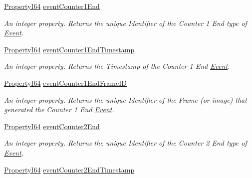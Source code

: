 \begin{DoxyCompactItemize}
\hyperlink{group___common_interface_ga81749b2696755513663492664a18a893}{Property\+I64} \hyperlink{classmv_i_m_p_a_c_t_1_1acquire_1_1_gen_i_cam_1_1_event_control_a011b17aced94eef7d68e333db99008e8}{event\+Counter1\+End}
\begin{DoxyCompactList}\small\item\em An integer property. Returns the unique Identifier of the Counter 1 End type of \hyperlink{classmv_i_m_p_a_c_t_1_1acquire_1_1_event}{Event}. \end{DoxyCompactList}\item 
\hyperlink{group___common_interface_ga81749b2696755513663492664a18a893}{Property\+I64} \hyperlink{classmv_i_m_p_a_c_t_1_1acquire_1_1_gen_i_cam_1_1_event_control_a9891545e43a59cdb3b1584bd09232123}{event\+Counter1\+End\+Timestamp}
\begin{DoxyCompactList}\small\item\em An integer property. Returns the Timestamp of the Counter 1 End \hyperlink{classmv_i_m_p_a_c_t_1_1acquire_1_1_event}{Event}. \end{DoxyCompactList}\item 
\hyperlink{group___common_interface_ga81749b2696755513663492664a18a893}{Property\+I64} \hyperlink{classmv_i_m_p_a_c_t_1_1acquire_1_1_gen_i_cam_1_1_event_control_a5cfb22ee0b5251a0ec19b2f4ea025eea}{event\+Counter1\+End\+Frame\+I\+D}
\begin{DoxyCompactList}\small\item\em An integer property. Returns the unique Identifier of the Frame (or image) that generated the Counter 1 End \hyperlink{classmv_i_m_p_a_c_t_1_1acquire_1_1_event}{Event}. \end{DoxyCompactList}\item 
\hyperlink{group___common_interface_ga81749b2696755513663492664a18a893}{Property\+I64} \hyperlink{classmv_i_m_p_a_c_t_1_1acquire_1_1_gen_i_cam_1_1_event_control_a44fad255babc1a2a2f4041b7325f0d88}{event\+Counter2\+End}
\begin{DoxyCompactList}\small\item\em An integer property. Returns the unique Identifier of the Counter 2 End type of \hyperlink{classmv_i_m_p_a_c_t_1_1acquire_1_1_event}{Event}. \end{DoxyCompactList}\item 
\hyperlink{group___common_interface_ga81749b2696755513663492664a18a893}{Property\+I64} \hyperlink{classmv_i_m_p_a_c_t_1_1acquire_1_1_gen_i_cam_1_1_event_control_afb077dd9a264f75381d84ec0fcae7b20}{event\+Counter2\+End\+Timestamp}

\end{DoxyCompactItemize}

